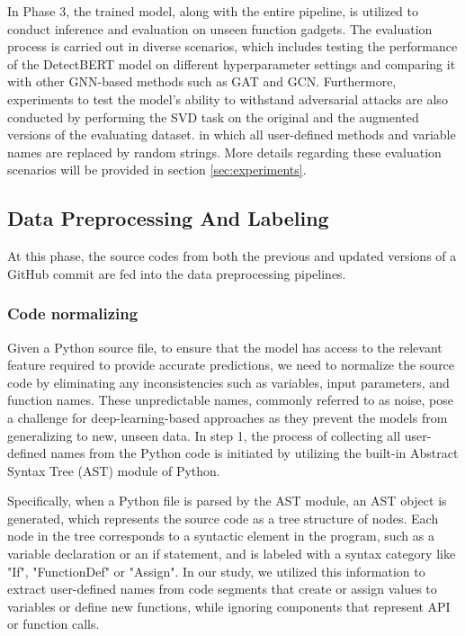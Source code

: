 \documentclass{ieeeaccess}
\begin{document}
\par In Phase 3, the trained model, along with the entire pipeline, is utilized to conduct inference and evaluation on unseen function gadgets. The evaluation process is carried out in diverse scenarios, which includes testing the performance of the DetectBERT model on different hyperparameter settings and comparing it with other GNN-based methods such as GAT and GCN. Furthermore, experiments to test the model's ability to withstand adversarial attacks are  also conducted by performing the SVD task on the original and the augmented versions of the evaluating dataset. in which all user-defined methods and variable names are replaced by random strings. More details regarding these evaluation scenarios will be provided in section \ref{sec:experiments}.
\subsection{Data Preprocessing And Labeling}\label{sec:FE}
At this phase, the source codes from both the previous and updated versions of a GitHub commit are fed into the data preprocessing pipelines.
\subsubsection{Code normalizing}
\par Given a Python source file, to ensure that the model has access to the relevant feature required to provide accurate predictions, we need to normalize the source code by eliminating any inconsistencies such as variables, input parameters, and function names. These unpredictable names, commonly referred to as noise, pose a challenge for deep-learning-based approaches as they prevent the models from generalizing to new, unseen data. In step 1, the process of collecting all user-defined names from the Python code is initiated by utilizing the built-in Abstract Syntax Tree (AST) module of Python. 
\par Specifically, when a Python file is parsed by the AST module, an AST object is generated, which represents the source code as a tree structure of nodes. Each node in the tree corresponds to a syntactic element in the program, such as a variable declaration or an if statement, and is labeled with a syntax category like "If", "FunctionDef" or "Assign". In our study, we utilized this information to extract user-defined names from code segments that create or assign values to variables or define new functions, while ignoring components that represent API or function calls.
\end{document}
